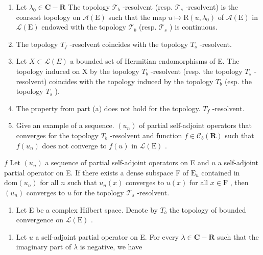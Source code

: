 \begin{enumerate}
\def\labelenumi{\alph{enumi})}
\item
  Let \(\lambda_0\in \mathbf{C} - \mathbf{R}\) The topology \(\mathcal{T}_b\) -resolvent (resp. \(\mathcal{T}_s\) -resolvent) is the coarsest topology on \(\mathcal{A}(\mathrm{E})\) such that the map \(u\mapsto \mathrm{R}(u,\lambda_0)\) of \(\mathcal{A}(\mathrm{E})\) in \(\mathcal{L}(\mathrm{E})\) endowed with the topology \(\mathcal{T}_b\) (resp. \(\mathcal{T}_s\) ) is continuous.
\item
  The topology \(T_{f}\) -resolvent coincides with the topology \(T_{s}\) -resolvent.
\item
  Let \(X \subset \mathcal{L}(E)\) a bounded set of Hermitian endomorphisms of E. The topology induced on X by the topology \(T_{b}\) -resolvent (resp. the topology \(T_{s}\) -resolvent) coincides with the topology induced by the topology \(T_{b}\) (esp. the topology \(T_{s}\) ).
\item
  The property from part (a) does not hold for the topology. \(T_{f}\) -resolvent.
\item
  Give an example of a sequence. \((u_{n})\) of partial self-adjoint operators that converges for the topology \(T_{b}\) -resolvent and function \(f \in \mathcal{C}_{b}(\mathbf{R})\) such that \(f(u_{n})\) does not converge to \(f(u)\) in \(\mathcal{L}(\mathrm{E})\) .
\end{enumerate}

\(f\) Let \((u_n)\) a sequence of partial self-adjoint operators on E and \(u\) a self-adjoint partial operator on E. If there exists a dense subspace F of \(\mathrm{E}_u\) contained in \(\mathrm{dom}(u_n)\) for all \(n\) such that \(u_n(x)\) converges to \(u(x)\) for all \(x \in \mathrm{F}\) , then \((u_n)\) converges to \(u\) for the topology \(\mathcal{T}_s\) -resolvent.

\begin{enumerate}
\def\labelenumi{\arabic{enumi})}
\setcounter{enumi}{29}
\tightlist
\item
  Let E be a complex Hilbert space. Denote by \(T_{b}\) the topology of bounded convergence on \(\mathcal{L}(\mathrm{E})\) .
\end{enumerate}

\begin{enumerate}
\def\labelenumi{\alph{enumi})}
\tightlist
\item
  Let \(u\) a self-adjoint partial operator on E. For every \(\lambda \in \mathbf{C} - \mathbf{R}\) such that the imaginary part of \(\lambda\) is negative, we have
\end{enumerate}

